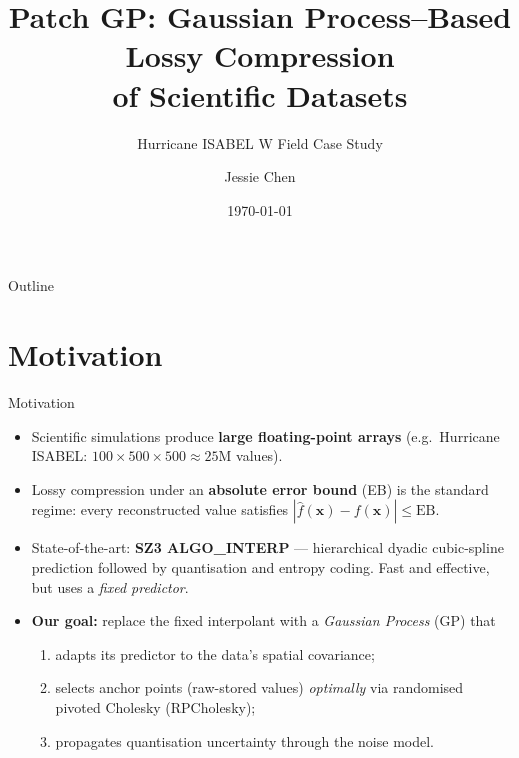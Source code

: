 \documentclass[10pt]{beamer}
\title[Patch GP Compression]{%
  Patch GP: Gaussian Process–Based Lossy Compression\\
  of Scientific Datasets}
\subtitle{Hurricane ISABEL W Field Case Study}
\author{Jessie Chen}
\institute{NC State University / Argonne National Laboratory}
\date{\today}
\begin{document}
\begin{frame}
  \titlepage
\end{frame}

\begin{frame}{Outline}
  \tableofcontents
\end{frame}

\section{Motivation}
\begin{frame}{Motivation}
  \begin{itemize}
    \item Scientific simulations produce \textbf{large floating-point arrays}
          (e.g.\ Hurricane ISABEL: $100\times500\times500\approx25$M values).
    \item Lossy compression under an \textbf{absolute error bound} (EB) is
          the standard regime: every reconstructed value satisfies
          $|\hat{f}(\mathbf{x})-f(\mathbf{x})|\leq\mathrm{EB}$.
    \item State-of-the-art: \textbf{SZ3 ALGO\_INTERP} — hierarchical dyadic
          cubic-spline prediction followed by quantisation and entropy coding.
          Fast and effective, but uses a \emph{fixed predictor}.
    \item \textbf{Our goal:} replace the fixed interpolant with a
          \emph{Gaussian Process} (GP) that
          \begin{enumerate}
            \item adapts its predictor to the data's spatial covariance;
            \item selects anchor points (raw-stored values)
                  \emph{optimally} via randomised pivoted Cholesky (RPCholesky);
            \item propagates quantisation uncertainty through the noise model.
          \end{enumerate}
  \end{itemize}
\end{frame}

\end{document}
